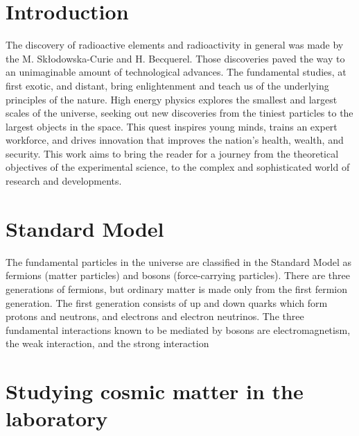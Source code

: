 \section{Introduction}


 The discovery of radioactive elements and radioactivity in general was made by the M. Skłodowska-Curie and H. Becquerel. Those discoveries paved the way to an unimaginable amount of technological advances. The fundamental studies, at first exotic, and distant, bring enlightenment and teach us of the underlying principles of the nature. 
 High energy physics explores the smallest and largest scales of the universe, seeking out new discoveries from the tiniest particles to the largest objects in the space. This quest inspires young minds, trains an expert workforce, and drives innovation that improves the nation’s health, wealth, and security.
 This work aims to bring the reader for a journey from the theoretical objectives of the experimental science, to the complex and sophisticated world of research and developments. 
 
\section{Standard Model}
The fundamental particles in the universe are classified in the Standard Model as fermions (matter particles) and bosons (force-carrying particles). There are three generations of fermions, but ordinary matter is made only from the first fermion generation. The first generation consists of up and down quarks which form protons and neutrons, and electrons and electron neutrinos. The three fundamental interactions known to be mediated by bosons are electromagnetism, the weak interaction, and the strong interaction
\section{Studying cosmic matter in the laboratory}


